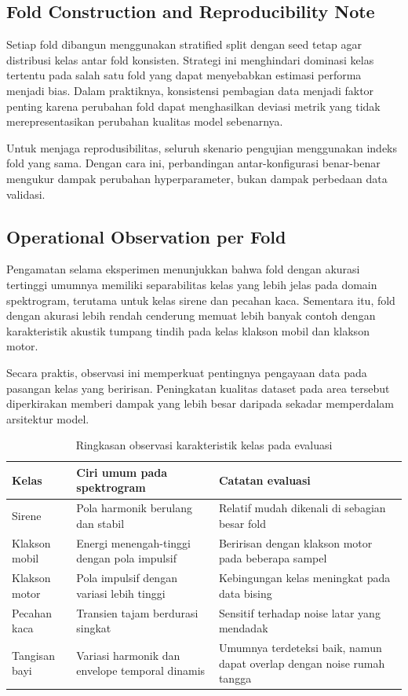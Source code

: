 \documentclass[10pt,a4paper]{jurnalvarian}
\let\LaTeXsubsection\subsection
\def\subsection{\setlength{\leftskip}{0.6cm}\LaTeXsubsection}
\begin{document}
\subsection{Fold Construction and Reproducibility Note}
Setiap fold dibangun menggunakan stratified split dengan seed tetap agar distribusi kelas antar fold konsisten. Strategi ini menghindari dominasi kelas tertentu pada salah satu fold yang dapat menyebabkan estimasi performa menjadi bias. Dalam praktiknya, konsistensi pembagian data menjadi faktor penting karena perubahan fold dapat menghasilkan deviasi metrik yang tidak merepresentasikan perubahan kualitas model sebenarnya.

Untuk menjaga reprodusibilitas, seluruh skenario pengujian menggunakan indeks fold yang sama. Dengan cara ini, perbandingan antar-konfigurasi benar-benar mengukur dampak perubahan hyperparameter, bukan dampak perbedaan data validasi.

\subsection{Operational Observation per Fold}
Pengamatan selama eksperimen menunjukkan bahwa fold dengan akurasi tertinggi umumnya memiliki separabilitas kelas yang lebih jelas pada domain spektrogram, terutama untuk kelas sirene dan pecahan kaca. Sementara itu, fold dengan akurasi lebih rendah cenderung memuat lebih banyak contoh dengan karakteristik akustik tumpang tindih pada kelas klakson mobil dan klakson motor.

Secara praktis, observasi ini memperkuat pentingnya pengayaan data pada pasangan kelas yang beririsan. Peningkatan kualitas dataset pada area tersebut diperkirakan memberi dampak yang lebih besar daripada sekadar memperdalam arsitektur model.

\begin{table}[H]
\centering
\fontsize{8pt}{10pt}\selectfont
\caption{Ringkasan observasi karakteristik kelas pada evaluasi}
\begin{tabular}{p{3.1cm}p{3.4cm}p{4.0cm}}
\hline
Kelas & Ciri umum pada spektrogram & Catatan evaluasi \\
\hline
Sirene & Pola harmonik berulang dan stabil & Relatif mudah dikenali di sebagian besar fold \\
Klakson mobil & Energi menengah-tinggi dengan pola impulsif & Beririsan dengan klakson motor pada beberapa sampel \\
Klakson motor & Pola impulsif dengan variasi lebih tinggi & Kebingungan kelas meningkat pada data bising \\
Pecahan kaca & Transien tajam berdurasi singkat & Sensitif terhadap noise latar yang mendadak \\
Tangisan bayi & Variasi harmonik dan envelope temporal dinamis & Umumnya terdeteksi baik, namun dapat overlap dengan noise rumah tangga \\
\hline
\end{tabular}
\end{table}
\end{document}
